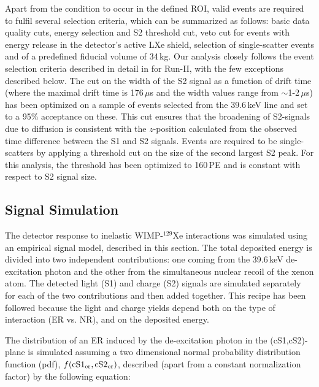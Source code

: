 Apart from the condition to occur in the defined ROI, valid events are required to fulfil several selection criteria, 
which can be summarized as follows: basic data quality cuts, energy selection and S2 threshold cut, veto cut for events with energy release in the detector's 
active LXe shield, selection of single-scatter events and of a predefined fiducial volume of 34\,kg.  
Our analysis closely follows the event selection criteria described in detail in \cite{Aprile:2012vw} for Run-II, with the few exceptions described below. 
The cut on the width of the S2 signal as a function of drift time (where the maximal drift time is 176\,$\mu$s and the width values range from $\sim$1-2\,$\mu$s) has been optimized on a sample of events selected from the 39.6\,keV line and set to a 95\% acceptance on these. This cut ensures that the broadening of S2-signals due to diffusion is consistent with the $z$-position calculated from the observed time difference between the S1 and S2 signals. Events are required to be single-scatters by applying a threshold cut on the size of the 
second largest S2 peak. For this analysis, the threshold has been optimized to 160\,PE and is constant with respect to S2 signal size. 


\subsection{Signal Simulation} 

The detector response to inelastic WIMP-$^{129}$Xe interactions was simulated using an empirical signal model, described in this section.
The total deposited energy is divided into two independent contributions: one coming from the 39.6\,keV de-excitation photon and the other  from  
the simultaneous nuclear recoil of the xenon atom. The detected light (S1) and charge (S2) signals are simulated separately for each of the two contributions 
and then added together. This recipe has been followed  because the light and charge yields depend both on the type of interaction (ER vs. NR), and on the deposited energy.


The distribution of an ER induced by the de-excitation photon in the (cS1,cS2)-plane  is simulated assuming a two dimensional normal probability distribution function (pdf), $f(\rm{cS1}_{er},\rm{cS2}_{er})$, 
described (apart from a constant normalization factor) by the following equation:

